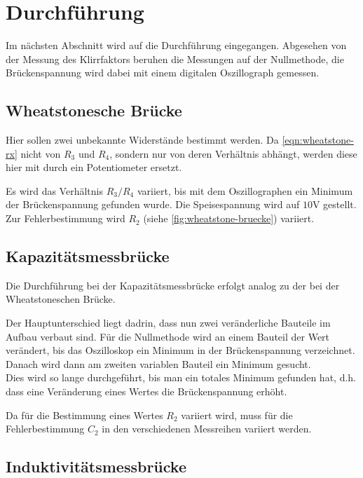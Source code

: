 \section{Durchführung}
\label{sec:Durchführung}
Im nächsten Abschnitt wird auf die Durchführung eingegangen. Abgesehen von der Messung des
Klirrfaktors beruhen die Messungen auf der 
Nullmethode, die Brückenspannung wird dabei mit einem digitalen Oszillograph gemessen.

\subsection{Wheatstonesche Brücke}
\label{sec:exec-wheatstone}

Hier sollen zwei unbekannte Widerstände bestimmt werden. Da \autoref{eqn:wheatstone-rx} nicht von 
$R_3$ und $R_4$, sondern nur von deren Verhältnis abhängt,
werden diese hier mit durch ein Potentiometer ersetzt.

Es wird das Verhältnis $R_3/R_4$ variiert, bis mit dem Oszillographen ein Minimum der Brückenspannung
gefunden wurde. Die Speisespannung wird auf $10\si{\volt}$ gestellt. Zur Fehlerbestimmung wird $R_2$
(siehe \autoref{fig:wheatstone-bruecke}) variiert.

\subsection{Kapazitätsmessbrücke}
\label{sec:exec-kapazitaetsmessbrueck}

Die Durchführung bei der Kapazitätsmessbrücke erfolgt analog zu der bei der Wheatstoneschen Brücke.

Der Hauptunterschied liegt dadrin, dass nun zwei veränderliche Bauteile im Aufbau verbaut sind. Für die
Nullmethode wird an einem Bauteil der Wert verändert, bis das Oszilloskop ein Minimum in der Brückenspannung
verzeichnet. Danach wird dann am zweiten variablen Bauteil ein Minimum gesucht.
\\
Dies wird so lange durchgeführt, bis man ein totales Minimum gefunden hat, d.h. dass eine Veränderung eines
Wertes die Brückenspannung erhöht.

Da für die Bestimmung eines Wertes $R_2$ variiert wird, muss für die Fehlerbestimmung $C_2$ in den 
verschiedenen Messreihen variiert werden.

\subsection{Induktivitätsmessbrücke}
\label{sec:exec-induktivitätsmessbrücke}

